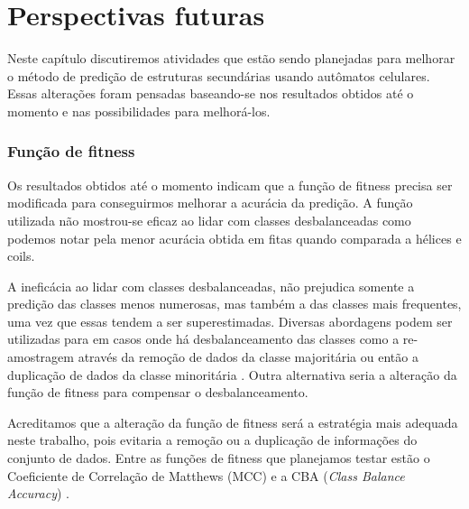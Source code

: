 \chapter{Perspectivas futuras}


Neste capítulo discutiremos atividades que estão sendo planejadas para melhorar o método de predição de estruturas secundárias usando autômatos celulares. Essas alterações foram pensadas baseando-se nos resultados obtidos até o momento e nas possibilidades para melhorá-los.

\subsection{Função de fitness}


Os resultados obtidos até o momento indicam que a função de fitness precisa ser modificada para conseguirmos melhorar a acurácia da predição. A função utilizada não mostrou-se eficaz ao lidar com classes desbalanceadas como podemos notar pela menor acurácia obtida em fitas quando comparada a hélices e coils.

A ineficácia ao lidar com classes desbalanceadas, não prejudica somente a predição das classes menos numerosas, mas também a das classes mais frequentes, uma vez que essas tendem a ser superestimadas. Diversas abordagens podem ser utilizadas para em casos onde há desbalanceamento das classes como a re-amostragem através da remoção de dados da classe majoritária ou então a duplicação de dados da classe minoritária \cite{Kumar2012}. Outra alternativa seria a alteração da função de fitness para compensar o desbalanceamento.

Acreditamos que a alteração da função de fitness será a estratégia mais adequada neste trabalho, pois evitaria a remoção ou a duplicação de informações do conjunto de dados. Entre as funções de fitness que planejamos testar estão o Coeficiente de Correlação de Matthews (MCC) \cite{Gorodkin2004} e a CBA (\textit{Class Balance Accuracy}) \cite{Mosley2013}.  



